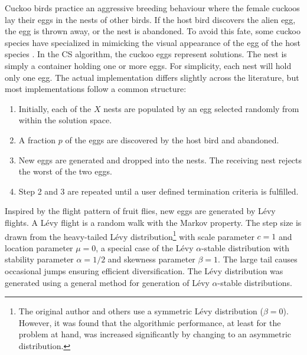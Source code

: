 \documentclass[a4paper, 12pt, sort&compress]{elsarticle}%
\begin{document}
Cuckoo birds practice an aggressive breeding behaviour where the female
cuckoos lay their eggs in the nests of other birds. If the host bird
discovers the alien egg, the egg is thrown away, or the nest is
abandoned. To avoid this fate, some cuckoo species have specialized in
mimicking the visual appearance of the egg of the host species
\cite{Payne2005}. In the CS algorithm, the cuckoo eggs represent
solutions. The nest is simply a container holding one or
more eggs. For simplicity, each nest will hold only one egg. The
actual implementation differs slightly across the
literature\cite{YangDeb,Walton,Tuba}, but most implementations follow
a common structure:

\begin{enumerate}
\item Initially, each of the $X$
  nests are populated by an egg selected randomly from within the
  solution space.
\item A fraction $p$ of the eggs are discovered by the host bird and
  abandoned.
\item New eggs are generated and dropped into the nests. The receiving
  nest rejects the worst of the two eggs.
\item Step 2 and 3 are repeated until a user defined termination
  criteria is fulfilled.
\end{enumerate}

Inspired by the flight pattern of fruit flies\cite{Reynolds}, new eggs
are generated by Lévy flights. A Lévy flight is a random walk with the
Markov property. The step size is drawn from the heavy-tailed Lévy
distribution\footnote{The original author and
  others\cite{YangDeb,Walton,Tuba} use a symmetric Lévy distribution
  ($\beta = 0$). However, it was found that the algorithmic performance,
  at least for the problem at hand, was increased significantly by
  changing to an asymmetric distribution.}
with scale parameter $c = 1$ and location parameter $\mu = 0$, a special
case of the Lévy $\alpha$-stable distribution with stability parameter
$\alpha = 1/2$ and skewness parameter $\beta = 1$. The large tail causes
occasional jumps ensuring efficient diversification. The Lévy
distribution was generated using a general method for generation of
Lévy $\alpha$-stable distributions\cite{Weron1994}.


\end{document}
